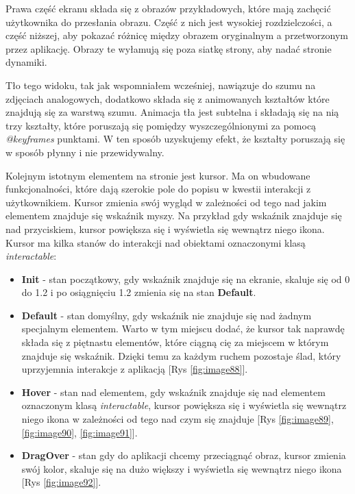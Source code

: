 Prawa część ekranu składa się z obrazów przykładowych, które mają zachęcić użytkownika do przesłania obrazu. Część z nich jest wysokiej rozdzielczości, a część niższej, aby pokazać różnicę między obrazem oryginalnym a przetworzonym przez aplikację. Obrazy te wyłamują się poza siatkę strony, aby nadać stronie dynamiki.

Tło tego widoku, tak jak wspomniałem wcześniej, nawiązuje do szumu na zdjęciach analogowych, dodatkowo składa się z animowanych kształtów które znajdują się za warstwą szumu. Animacja tła jest subtelna i składają się na nią trzy kształty, które poruszają się pomiędzy wyszczególnionymi za pomocą \textit{@keyframes} punktami. W ten sposób uzyskujemy efekt, że kształty poruszają się w sposób płynny i nie przewidywalny.

Kolejnym istotnym elementem na stronie jest kursor. Ma on wbudowane funkcjonalności, które dają szerokie pole do popisu w kwestii interakcji z użytkownikiem. Kursor zmienia swój wygląd w zależności od tego nad jakim elementem znajduje się wskaźnik myszy. Na przykład gdy wskaźnik znajduje się nad przyciskiem, kursor powiększa się i wyświetla się wewnątrz niego ikona. 
Kursor ma kilka stanów do interakcji nad obiektami oznaczonymi klasą \textit{interactable}:

\begin{itemize}
    \item \textbf{Init} - stan początkowy, gdy wskaźnik znajduje się na ekranie, skaluje się od 0 do 1.2 i po osiągnięciu 1.2 zmienia się na stan \textbf{Default}.
    \item \textbf{Default} - stan domyślny, gdy wskaźnik nie znajduje się nad żadnym specjalnym elementem. Warto w tym miejscu dodać, że kursor tak naprawdę składa się z piętnastu elementów, które ciągną cię za miejscem w którym znajduje się wskaźnik. Dzięki temu za każdym ruchem pozostaje ślad, który uprzyjemnia interakcje z aplikacją [Rys \ref{fig:image88}].
    \item \textbf{Hover} - stan nad elementem, gdy wskaźnik znajduje się nad elementem oznaczonym klasą \textit{interactable}, kursor powiększa się i wyświetla się wewnątrz niego ikona w zależności od tego nad czym się znajduje [Rys \ref{fig:image89}, \ref{fig:image90}, \ref{fig:image91}].
    \item \textbf{DragOver} - stan gdy do aplikacji chcemy przeciągnąć obraz, kursor zmienia swój kolor, skaluje się na dużo większy i wyświetla się wewnątrz niego ikona [Rys \ref{fig:image92}].
\end{itemize}

